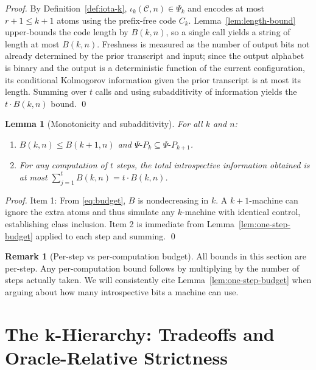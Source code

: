 \documentclass[11pt]{article}
\newtheorem{lemma}[theorem]{Lemma}
\theoremstyle{definition}
\newtheorem{remark}[theorem]{Remark}
\newcommand{\PSi}{\Psi}
\begin{document}
\begin{proof}
By Definition~\ref{def:iota-k}, $\iota_k(\mathcal{C},n)\in\PSi_k$ and encodes at most $r+1\le k+1$ atoms using the prefix-free code $C_k$. Lemma~\ref{lem:length-bound} upper-bounds the code length by $B(k,n)$, so a single call yields a string of length at most $B(k,n)$. Freshness is measured as the number of output bits not already determined by the prior transcript and input; since the output alphabet is binary and the output is a deterministic function of the current configuration, its conditional Kolmogorov information given the prior transcript is at most its length. Summing over $t$ calls and using subadditivity of information yields the $t\cdot B(k,n)$ bound. \qed
\end{proof}

\begin{lemma}[Monotonicity and subadditivity]
\label{lem:monotone}
For all $k$ and $n$:
\begin{enumerate}
  \item $B(k,n)\le B(k+1,n)$ and $\PSi\text{-}P_k\subseteq \PSi\text{-}P_{k+1}$.
  \item For any computation of $t$ steps, the total introspective information obtained is at most $\sum_{j=1}^{t} B(k,n) = t\cdot B(k,n)$.
\end{enumerate}
\end{lemma}

\begin{proof}
Item 1: From \eqref{eq:budget}, $B$ is nondecreasing in $k$. A $k{+}1$-machine can ignore the extra atoms and thus simulate any $k$-machine with identical control, establishing class inclusion. Item 2 is immediate from Lemma~\ref{lem:one-step-budget} applied to each step and summing. \qed
\end{proof}

\begin{remark}[Per-step vs per-computation budget]
All bounds in this section are per-step. Any per-computation bound follows by multiplying by the number of steps actually taken. We will consistently cite Lemma~\ref{lem:one-step-budget} when arguing about how many introspective bits a machine can use.
\end{remark}

\section{The k-Hierarchy: Tradeoffs and Oracle-Relative Strictness}
\end{document}
